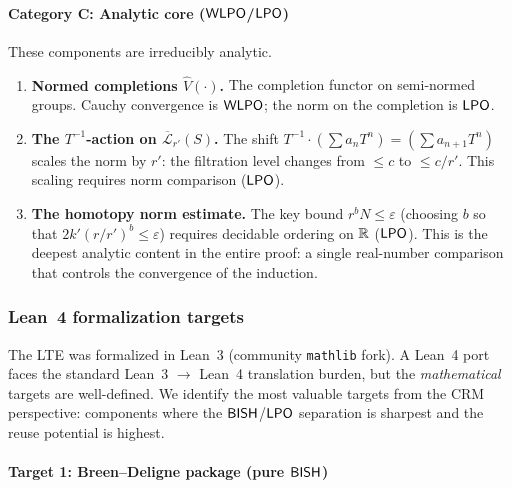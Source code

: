 \paragraph{Category C: Analytic core ($\textsf{WLPO}$/$\textsf{LPO}$)}

These components are irreducibly analytic.

\begin{enumerate}[nosep]
\item \textbf{Normed completions $\widehat{V}(\cdot)$.}
  The completion functor on semi-normed groups.  Cauchy
  convergence is $\textsf{WLPO}$; the norm on the completion is $\textsf{LPO}$.

\item \textbf{The $T^{-1}$-action on $\overline{\mathcal{L}}_{r'}(S)$.}
  The shift $T^{-1} \cdot (\sum a_n T^n) = (\sum a_{n+1} T^n)$
  scales the norm by $r'$: the filtration level changes from
  $\leq c$ to $\leq c/r'$.  This scaling requires norm
  comparison ($\textsf{LPO}$).

\item \textbf{The homotopy norm estimate.}
  The key bound $r^b N \leq \varepsilon$ (choosing $b$ so that
  $2k'(r/r')^b \leq \varepsilon$) requires decidable ordering
  on $\mathbb{R}$ ($\textsf{LPO}$).  This is the deepest analytic content in
  the entire proof: a single real-number comparison that
  controls the convergence of the induction.
\end{enumerate}

\subsubsection{Lean~4 formalization targets}\label{sec:lean4}

The LTE was formalized in Lean~3 (community \texttt{mathlib} fork).
A Lean~4 port faces the standard Lean~3 $\to$ Lean~4 translation
burden, but the \emph{mathematical} targets are well-defined.
We identify the most valuable targets from the CRM perspective:
components where the $\textsf{BISH}$/$\textsf{LPO}$ separation is sharpest and
the reuse potential is highest.

\paragraph{Target 1: Breen--Deligne package (pure $\textsf{BISH}$)}

